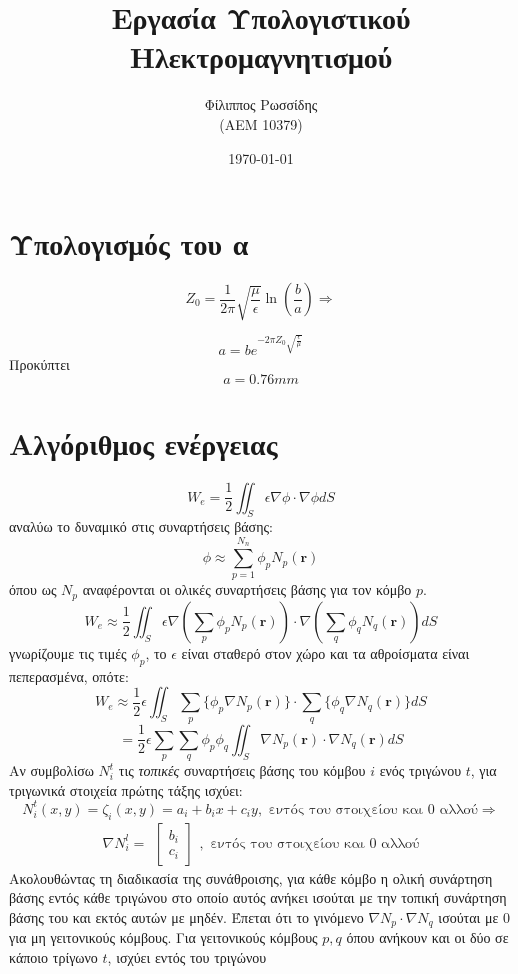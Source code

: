 \documentclass[10pt, letterpaper]{article}
\title{Εργασία Υπολογιστικού Ηλεκτρομαγνητισμού}
\author{Φίλιππος Ρωσσίδης \\ (ΑΕΜ 10379)}
\date{\today}
\begin{document}
\maketitle

\section*{Υπολογισμός του α}

\[ Z_0 = \frac{1}{2 \pi}\sqrt{\frac{\mu}{\epsilon}} \ln (\frac{b}{a}) \Rightarrow \]

\[ a = b e^{-2\pi Z_0 \sqrt{\frac{\epsilon}{\mu}}} \]
Προκύπτει
\[a = 0.76 mm\]


\section*{Αλγόριθμος ενέργειας}

\[W_e = \frac{1}{2} \iint_S \epsilon \nabla \phi  \cdot \nabla \phi dS\]
αναλύω το δυναμικό στις συναρτήσεις βάσης:
\[\phi \approx \sum_{p=1}^{N_n} \phi_p N_p(\mathbf{r}) \]
όπου ως $N_p$ αναφέρονται οι ολικές συναρτήσεις βάσης για τον κόμβο $p$.
\[W_e \approx \frac{1}{2} \iint_S \epsilon \nabla (\sum_p \phi_p N_p(\mathbf{r}))  \cdot \nabla (\sum_q \phi_q N_q(\mathbf{r})) dS\]
γνωρίζουμε τις τιμές $\phi_p$, το $\epsilon$ είναι σταθερό στον χώρο και τα αθροίσματα είναι πεπερασμένα, οπότε:
\[ W_e \approx  \frac{1}{2} \epsilon \iint_S  \sum_p \{ \phi_p \nabla N_p(\mathbf{r}) \} \cdot  \sum_q \{ \phi_q \nabla N_q(\mathbf{r}) \} dS\]
\[ = \frac{1}{2} \epsilon  \sum_p \sum_q  \phi_p \phi_q \iint_S \nabla N_p(\mathbf{r})  \cdot \nabla N_q(\mathbf{r})  dS \]
Αν συμβολίσω $N_i^t$ τις \emph{τοπικές} συναρτήσεις βάσης του κόμβου $i$ ενός τριγώνου $t$, για τριγωνικά στοιχεία πρώτης τάξης ισχύει: 
\[ N_i^t (x,y) =  \zeta_i(x,y) = a_i + b_ix + c_iy, \text{\ εντός του στοιχείου και $0$ αλλού}\Rightarrow\]
\[ \nabla N_i^l =   \begin{align} 
                        \begin{bmatrix}
                        b_i \\
                        c_i
                        \end{bmatrix}
                    \end{align}, \text{\ εντός του στοιχείου και $0$ αλλού}\]
Ακολουθώντας τη διαδικασία της συνάθροισης, για κάθε κόμβο η ολική συνάρτηση βάσης εντός κάθε τριγώνου στο οποίο αυτός ανήκει ισούται με 
την τοπική συνάρτηση βάσης του και εκτός αυτών με μηδέν.
Έπεται ότι το γινόμενο $\nabla N_p \cdot \nabla N_q$ ισούται με $0$ για μη γειτονικούς κόμβους. Για γειτονικούς κόμβους $p,q$ όπου 
ανήκουν και οι δύο σε κάποιο 
τρίγωνο $t$, ισχύει εντός του τριγώνου
\end{document}
